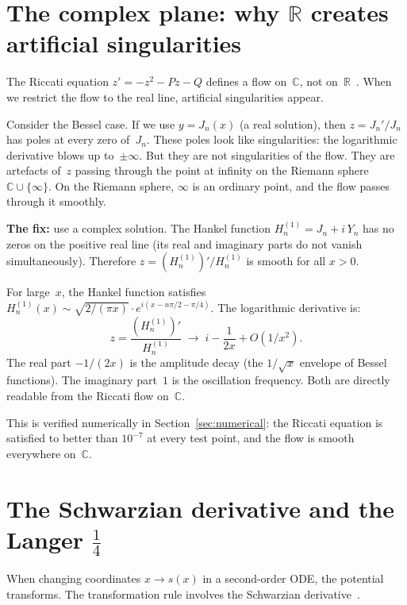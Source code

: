 \documentclass{amsart}
\theoremstyle{definition}
\theoremstyle{remark}
\begin{document}
\section{The complex plane: why $\mathbb{R}$ creates artificial singularities}\label{sec:complex}

The Riccati equation $z' = -z^2 - Pz - Q$ defines a flow on~$\mathbb{C}$, not on~$\mathbb{R}$~\cite{Hille1997}. When we restrict the flow to the real line, artificial singularities appear.

Consider the Bessel case. If we use $y = J_n(x)$ (a real solution), then $z = J_n'/J_n$ has poles at every zero of~$J_n$. These poles look like singularities: the logarithmic derivative blows up to~$\pm\infty$. But they are not singularities of the flow. They are artefacts of~$z$ passing through the point at infinity on the Riemann sphere $\mathbb{C} \cup \{\infty\}$. On the Riemann sphere, $\infty$ is an ordinary point, and the flow passes through it smoothly.

\textbf{The fix:} use a complex solution. The Hankel function $H_n^{(1)} = J_n + i\,Y_n$ has no zeros on the positive real line (its real and imaginary parts do not vanish simultaneously). Therefore $z = (H_n^{(1)})' / H_n^{(1)}$ is smooth for all $x > 0$.

For large~$x$, the Hankel function satisfies $H_n^{(1)}(x) \sim \sqrt{2/(\pi x)}\cdot e^{i(x - n\pi/2 - \pi/4)}$. The logarithmic derivative is:
\[
z = \frac{(H_n^{(1)})'}{H_n^{(1)}} \;\longrightarrow\; i - \frac{1}{2x} + O(1/x^2).
\]
The real part $-1/(2x)$ is the amplitude decay (the $1/\sqrt{x}$ envelope of Bessel functions). The imaginary part~$1$ is the oscillation frequency. Both are directly readable from the Riccati flow on~$\mathbb{C}$.

This is verified numerically in Section~\ref{sec:numerical}: the Riccati equation is satisfied to better than $10^{-7}$ at every test point, and the flow is smooth everywhere on~$\mathbb{C}$.

\section{The Schwarzian derivative and the Langer $\tfrac{1}{4}$}

When changing coordinates $x \to s(x)$ in a second-order ODE, the potential transforms. The transformation rule involves the Schwarzian derivative~\cite{Cayley1880, Nehari1949}.
\end{document}
